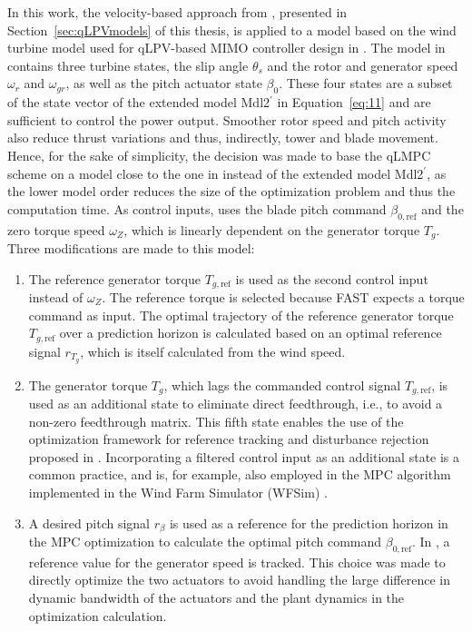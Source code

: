 In this work, the velocity-based approach from \cite{cisneros2020velocity}, presented in Section~\ref{sec:qLPVmodels} of this thesis, is applied to a model based on the wind turbine model used for qLPV-based MIMO controller design in \cite{Bianchi2007}. The model in \cite{Bianchi2007} contains three turbine states, the slip angle $\theta_s$ and the rotor and generator speed $\omega_r$ and $\omega_{gr}$, as well as the pitch actuator state $\beta_0$. These four states are a subset of the state vector of the extended model Mdl2$^\prime$ in Equation~\eqref{eq:11} and are sufficient to control the power output. Smoother rotor speed and pitch activity also reduce thrust variations and thus, indirectly, tower and blade movement. Hence, for the sake of simplicity, the decision was made to base the qLMPC scheme on a model close to the one in \cite{Bianchi2007} instead of the extended model Mdl2$^\prime$, as the lower model order reduces the size of the optimization problem and thus the computation time. As control inputs, \cite{Bianchi2007} uses the blade pitch command $\beta_{0,\text{ref}}$ and the zero torque speed $\omega_Z$, which is linearly dependent on the generator torque $T_g$. Three modifications are made to this model:
\begin{enumerate}
    \item The reference generator torque $T_{g,\text{ref}}$ is used as the second control input instead of $\omega_Z$. The reference torque is selected because FAST expects a torque command as input. The optimal trajectory of the reference generator torque $T_{g,\text{ref}}$ over a prediction horizon is calculated based on an optimal reference signal $r_{T_g}$, which is itself calculated from the wind speed.
    \item The generator torque $T_g$, which lags the commanded control signal $T_{g,\text{ref}}$, is used as an additional state to eliminate direct feedthrough, i.e., to avoid a non-zero feedthrough matrix. This fifth state enables the use of the optimization framework for reference tracking and disturbance rejection proposed in \cite{cisneros2020velocity}. Incorporating a filtered control input as an additional state is a common practice, and is, for example, also employed in the MPC algorithm implemented in the Wind Farm Simulator (WFSim) \cite{boersma2018control}. %
    \item A desired pitch signal $r_{\beta}$ is used as a reference for the prediction horizon in the MPC optimization to calculate the optimal pitch command $\beta_{0,\text{ref}}$. In \cite{Bianchi2007}, a reference value for the generator speed is tracked. This choice was made to directly optimize the two actuators to avoid handling the large difference in dynamic bandwidth of the actuators and the plant dynamics in the optimization calculation.
\end{enumerate}
